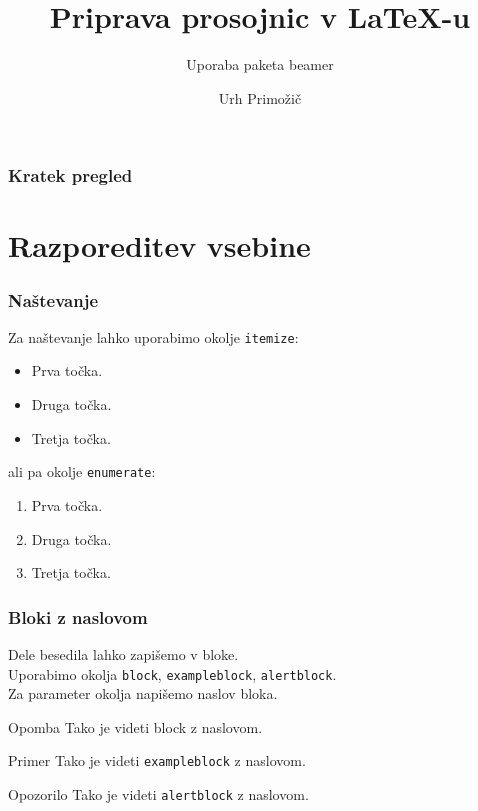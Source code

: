 \documentclass{beamer}
\author{Urh Primožič}
\title[O Beamerju in zaka je lajf]{Priprava prosojnic v \LaTeX{}-u}
\subtitle{Uporaba paketa beamer}
\institute[FMF]{Fakulteta za matematiko in fiziko}
\date{}
\begin{document}
\frame{\titlepage}


\begin{frame}
      \frametitle{Kratek pregled}
      \tableofcontents[pausesections]
\end{frame}




\section{Razporeditev vsebine}



 
 \begin{frame}
      \frametitle{Naštevanje}
      Za naštevanje lahko uporabimo okolje \texttt{itemize}:         
         \begin{itemize}
            \item Prva točka.
            \item Druga točka.
            \item Tretja točka.
         \end{itemize}
      ali pa okolje \texttt{enumerate}:
\begin{enumerate}
            \item Prva točka.
            \item Druga točka.
            \item Tretja točka.
\end{enumerate}
   
 \end{frame}

 
 \begin{frame}
      \frametitle{Bloki z naslovom}
      Dele besedila lahko zapišemo v bloke.\\
      Uporabimo okolja \texttt{block}, \texttt{exampleblock}, \texttt{alertblock}.\\
      Za parameter okolja napišemo naslov bloka.
      \begin{block}{Opomba}
      Tako je videti block z naslovom.
      \end{block}
      \begin{exampleblock}{Primer}
         Tako je videti \texttt{exampleblock} z naslovom.
      \end{exampleblock}
      \begin{alertblock}{Opozorilo}
         Tako je videti \texttt{alertblock} z naslovom.
      \end{alertblock}
 \end{frame}
\end{document}
